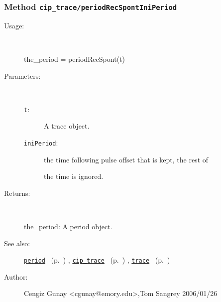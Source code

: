 \subsubsection[Method \texttt{periodRecSpontIniPeriod}]{Method \texttt{cip\_trace/periodRecSpontIniPeriod}}%
%
\label{ref_cip_trace__periodRecSpontIniPeriod}%
\hypertarget{ref_cip_trace__periodRecSpontIniPeriod}{}%
\begin{description}
%
\item[Usage:]~%
\begin{lyxcode}%
the\_period = periodRecSpont(t)
%
\end{lyxcode}%
%
%
\item[Parameters:]~
\begin{description}%
\item[\texttt{t}:]
 A trace object.
\item[\texttt{iniPeriod}:]
 the time following pulse offset that is kept, the rest of

the time is ignored.
\end{description}%
%
\item[Returns:
]~

	the\_period: A period object.
%
%
\item[See also:]%
\hyperlink{ref_period}{\texttt{period}}%
\ (p.~\pageref{ref_period})%
%
, \hyperlink{ref_cip_trace}{\texttt{cip\_trace}}%
\ (p.~\pageref{ref_cip_trace})%
%
, \hyperlink{ref_trace}{\texttt{trace}}%
\ (p.~\pageref{ref_trace})%
%
%
\item[Author:]%
Cengiz Gunay <cgunay@emory.edu>,Tom Sangrey 2006/01/26
%
\end{description}
\methodline%
